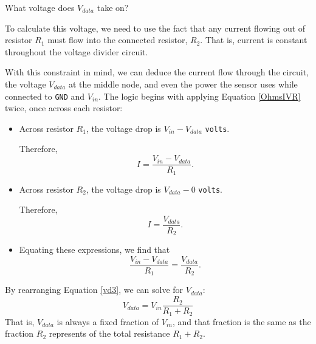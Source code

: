 What voltage does $V_{data}$ take on?

To calculate this voltage, we need to use the fact that any current flowing out of resistor $R_1$ must flow into the connected resistor, $R_2$.
That is, current is constant throughout the voltage divider circuit.

With this constraint in mind, we can deduce the current flow through the circuit, the voltage $V_{data}$ at the middle node, and even the power the sensor uses while connected to \texttt{GND} and $V_{in}$.
The logic begins with applying Equation \ref{OhmsIVR} twice, once across each resistor:
\begin{itemize}
	\item Across resistor $R_1$, the voltage drop is $V_{in}-V_{data}$ \texttt{volts}.

	Therefore,
	\begin{equation}\label{vd1}
	I = \frac{V_{in}-V_{data}}{R_1}.
	\end{equation}
	\item Across resistor $R_2$, the voltage drop is $V_{data}-0$ \texttt{volts}.

	Therefore,
	\begin{equation}\label{vd2}
	I = \frac{V_{data}}{R_2}.
	\end{equation}
	\item Equating these expressions, we find that
	\begin{equation}\label{vd3}
	\frac{V_{in}-V_{data}}{R_1} = \frac{V_{data}}{R_2}.
	\end{equation}
\end{itemize}
By rearranging Equation \ref{vd3}, we can solve for $V_{data}$:
\begin{equation}\label{vd4}
V_{data} = V_{in} \frac{R_2}{R_1+R_2}
\end{equation}
That is, $V_{data}$ is always a fixed fraction of $V_{in}$, and that fraction is the same as the fraction $R_2$ represents of the total resistance $R_1+R_2$.

